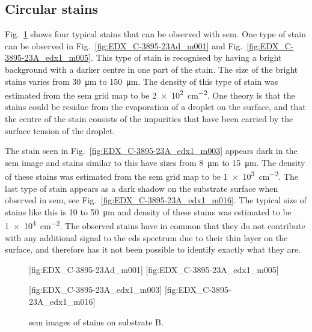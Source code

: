 \subsection{Circular stains}
Fig.~\ref{fig:subB_stains} shows four typical stains that can be observed with \ac{sem}. One type of stain can be observed in Fig.~\ref{fig:EDX_C-3895-23Ad_m001} and Fig.~\ref{fig:EDX_C-3895-23A_edx1_m005}. This type of stain is recognised by having a bright background with a darker centre in one part of the stain. The size of the bright stains varies from \SI{30}{\micro\metre} to \SI{150}{\micro\metre}. The density of this type of stain was estimated from the \ac{sem} grid map to be \SI{2e2}{\centi\metre^{-2}}. One theory  is that the stains could be residue from the evaporation of a droplet on the surface, and that the centre of the stain consists of the impurities that have been carried by the surface tension of the droplet. 

The stain seen in Fig.~\ref{fig:EDX_C-3895-23A_edx1_m003} appears dark in the \ac{sem} image and stains similar to this have sizes from \SI{8}{\micro\metre} to \SI{15}{\micro\metre}. The density of these stains was estimated from the \ac{sem} grid map to be \SI{1e3}{\centi\metre^{-2}}. The last type of stain appears as a dark shadow on the substrate surface when observed in \ac{sem}, see Fig.~\ref{fig:EDX_C-3895-23A_edx1_m016}. The typical size of stains like this is \SI{10}{} to \SI{50}{\micro\metre} and density of these stains was estimated to be \SI{1e4}{\centi\metre^{-2}}. The observed stains have in common that they do not contribute with any additional signal to the \ac{eds} spectrum due to their thin layer on the surface, and therefore has it not been possible to identify exactly what they are. 
\begin{figure}[htbp]
    \centering
    [fig:EDX_C-3895-23Ad_m001]
    [fig:EDX_C-3895-23A_edx1_m005]
    \par\bigskip
    [fig:EDX_C-3895-23A_edx1_m003]
    [fig:EDX_C-3895-23A_edx1_m016]
    \caption[\Ac{sem} images of stains on substrate B.]{\Acf{sem} images of stains on substrate B.}
    \label{fig:subB_stains}
\end{figure}

